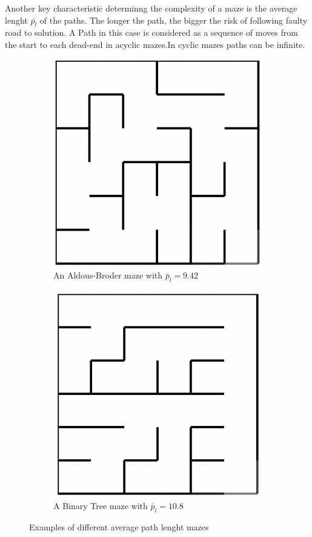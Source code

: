 \begin{description}[style=unboxed]
\begin{figure}[!h]
        \label{fig:test}
        \end{figure}
        \item[Path lenght] Another key characteristic determinng the complexity of a maze is the average lenght $\bar{p_l}$ of the paths. The longer the path, the bigger the risk of following faulty road to solution. A Path in this case is considered as a sequence of moves from the start to each dead-end in acyclic mazes.In cyclic mazes paths can be infinite. 
        \begin{figure}[!h]
            \centering
            \begin{subfigure}{.5\textwidth}
              \centering
              \includegraphics[width=.5\linewidth]{aldous}
              \caption{An Aldous-Broder maze with $\bar{p}_l = 9.42$}
              \label{fig:sub1}
            \end{subfigure}%
            \begin{subfigure}{.5\textwidth}
              \centering
              \includegraphics[width=.5\linewidth]{binary}
              \caption{A Binary Tree maze with $\bar{p}_l = 10.8$}
              \label{fig:sub2}
            \end{subfigure}
            \caption{Examples of different average path lenght mazes}

\end{figure}
\end{description}
